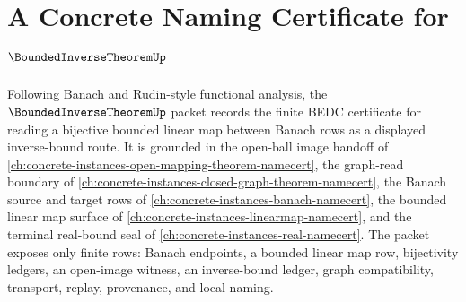 \chapter{A Concrete Naming Certificate for $\BoundedInverseTheoremUp$}
\label{ch:concrete-instances-bounded-inverse-theorem-namecert}

Following Banach and Rudin-style functional analysis, the $\BoundedInverseTheoremUp$ packet records the finite BEDC certificate for reading a bijective bounded linear map between Banach rows as a displayed inverse-bound route. It is grounded in the open-ball image handoff of \autoref{ch:concrete-instances-open-mapping-theorem-namecert}, the graph-read boundary of \autoref{ch:concrete-instances-closed-graph-theorem-namecert}, the Banach source and target rows of \autoref{ch:concrete-instances-banach-namecert}, the bounded linear map surface of \autoref{ch:concrete-instances-linearmap-namecert}, and the terminal real-bound seal of \autoref{ch:concrete-instances-real-namecert}. The packet exposes only finite rows: Banach endpoints, a bounded linear map row, bijectivity ledgers, an open-image witness, an inverse-bound ledger, graph compatibility, transport, replay, provenance, and local naming.

